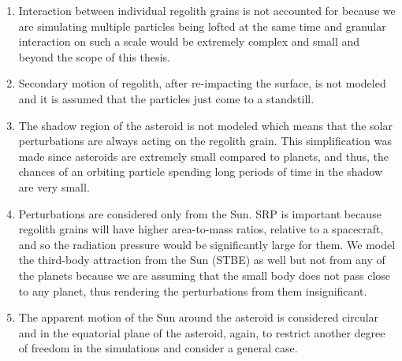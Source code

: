 \begin{enumerate}
\item Interaction between individual regolith grains is not accounted for because we are simulating multiple particles being lofted at the same time and granular interaction on such a scale would be extremely complex and small and beyond the scope of this thesis.

\item Secondary motion of regolith, after re-impacting the surface, is not modeled and it is assumed that the particles just come to a standstill.

\item The shadow region of the asteroid is not modeled which means that the solar perturbations are always acting on the regolith grain. This simplification was made since asteroids are extremely small compared to planets, and thus, the chances of an orbiting particle spending long periods of time in the shadow are very small.

\item Perturbations are considered only from the Sun. \gls{SRP} is important because regolith grains will have higher area-to-mass ratios, relative to a spacecraft, and so the radiation pressure would be significantly large for them. We model the third-body attraction from the Sun (\gls{STBE}) as well but not from any of the planets because we are assuming that the small body does not pass close to any planet, thus rendering the perturbations from them insignificant.

\item The apparent motion of the Sun around the asteroid is considered circular and in the equatorial plane of the asteroid, again, to restrict another degree of freedom in the simulations and consider a general case.
\end{enumerate}
\newpage

